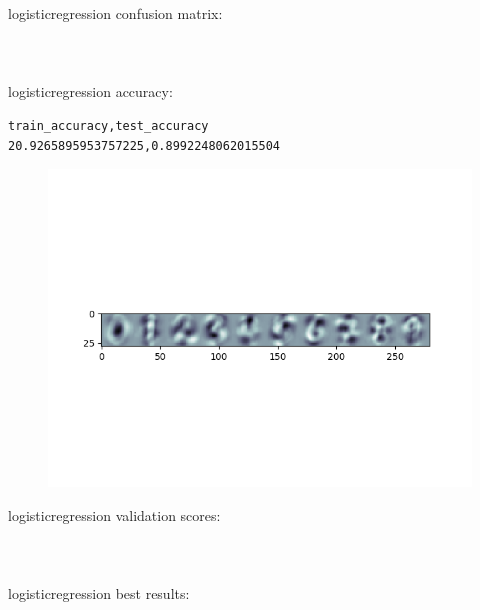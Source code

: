 \documentclass[paper=a4, fontsize=11pt]{scrartcl} %
\numberwithin{equation}{section} %
\numberwithin{figure}{section} %
\numberwithin{table}{section} %
\begin{document}
logistic\textunderscore regression \textunderscore confusion \textunderscore matrix: \\
  \\ \\ \\
logistic\textunderscore regression \textunderscore accuracy: \\
\begin{verbatim}
train_accuracy,test_accuracy
20.9265895953757225,0.8992248062015504
\end{verbatim}

\begin{figure}[h]
\center
\includegraphics[trim={0 4.5cm 0 5cm},clip]{logistic_regression_parameter_plot_1_128.png}
\end{figure}

logistic\textunderscore regression \textunderscore validation \textunderscore scores: \\
 \\ \\ \\

logistic\textunderscore regression \textunderscore best \textunderscore results: \\
 \\ \\ \\
\end{document}
